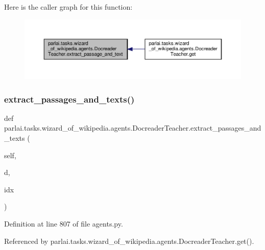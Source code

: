 Here is the caller graph for this function\+:
\nopagebreak
\begin{figure}[H]
\begin{center}
\leavevmode
\includegraphics[width=350pt]{classparlai_1_1tasks_1_1wizard__of__wikipedia_1_1agents_1_1DocreaderTeacher_ae91935a6b1c7e904a125d8e4a9033407_icgraph}
\end{center}
\end{figure}
\mbox{\label{classparlai_1_1tasks_1_1wizard__of__wikipedia_1_1agents_1_1DocreaderTeacher_a6ffe825efcf1e3db66262312f6a6dead}} 
\subsubsection{\texorpdfstring{extract\+\_\+passages\+\_\+and\+\_\+texts()}{extract\_passages\_and\_texts()}}
{\footnotesize\ttfamily def parlai.\+tasks.\+wizard\+\_\+of\+\_\+wikipedia.\+agents.\+Docreader\+Teacher.\+extract\+\_\+passages\+\_\+and\+\_\+texts (\begin{DoxyParamCaption}\item[{}]{self,  }\item[{}]{d,  }\item[{}]{idx }\end{DoxyParamCaption})}



Definition at line 807 of file agents.\+py.



Referenced by parlai.\+tasks.\+wizard\+\_\+of\+\_\+wikipedia.\+agents.\+Docreader\+Teacher.\+get().

